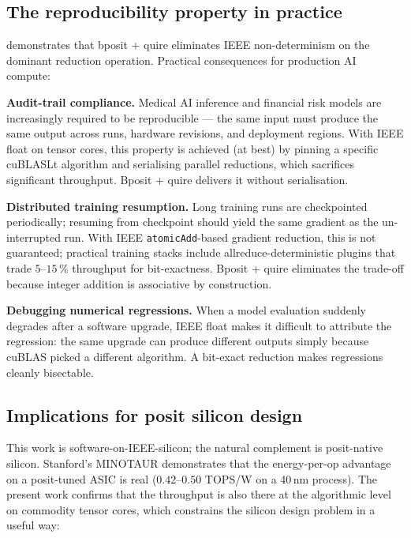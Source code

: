 \documentclass[11pt,a4paper]{article}
\newcommand{\TOPS}{\textsf{TOPS}}
\begin{document}
\subsection{The reproducibility property in practice}

 demonstrates that bposit + quire eliminates IEEE
non-determinism on the dominant reduction operation. Practical
consequences for production AI compute:

\textbf{Audit-trail compliance.} Medical AI inference and financial
risk models are increasingly required to be reproducible — the same
input must produce the same output across runs, hardware revisions,
and deployment regions. With IEEE float on tensor cores, this
property is achieved (at best) by pinning a specific cuBLASLt
algorithm and serialising parallel reductions, which sacrifices
significant throughput. Bposit + quire delivers it without
serialisation.

\textbf{Distributed training resumption.} Long training runs are
checkpointed periodically; resuming from checkpoint should yield the
same gradient as the un-interrupted run. With IEEE
\texttt{atomicAdd}-based gradient reduction, this is not guaranteed;
practical training stacks include allreduce-deterministic plugins
that trade $5\text{--}15\,\%$ throughput for bit-exactness. Bposit +
quire eliminates the trade-off because integer addition is associative
by construction.

\textbf{Debugging numerical regressions.} When a model evaluation
suddenly degrades after a software upgrade, IEEE float makes it
difficult to attribute the regression: the same upgrade can produce
different outputs simply because cuBLAS picked a different algorithm.
A bit-exact reduction makes regressions cleanly bisectable.

\subsection{Implications for posit silicon design}

This work is software-on-IEEE-silicon; the natural complement is
posit-native silicon. Stanford's MINOTAUR \cite{minotaur2025}
demonstrates that the energy-per-op advantage on a posit-tuned ASIC
is real ($0.42\text{--}0.50$ \TOPS{}/W on a 40\,nm process). The
present work confirms that the throughput is also there at the
algorithmic level on commodity tensor cores, which constrains the
silicon design problem in a useful way:
\end{document}
